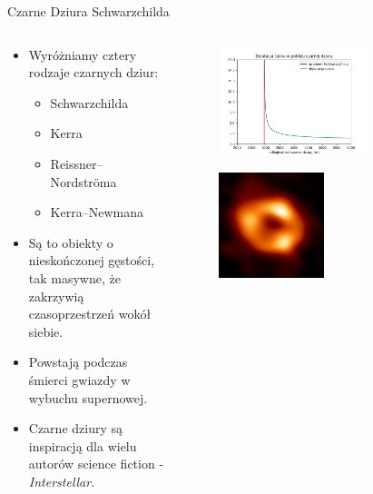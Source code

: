 \documentclass[polish, 9pt, xcolor=table, hyperref={pdfpagemode=FullScreen}]{beamer}
\begin{document}
\begin{frame}{Czarne Dziura Schwarzchilda}
\begin{columns}
\begin{column}{0.5\textwidth}
\begin{itemize}
\item
	Wyróżniamy cztery rodzaje czarnych dziur: 
\begin{itemize}
\item
	Schwarzchilda
\item 
	Kerra 
\item
	Reissner–Nordströma
\item 
	Kerra–Newmana
\end{itemize}
\item 
	Są to obiekty o nieskończonej gęstości, tak masywne, że zakrzywią czasoprzestrzeń wokół siebie.
\item 
	Powstają podczas śmierci gwiazdy w wybuchu supernowej. 
\item
	Czarne dziury są inspiracją dla wielu autorów science fiction - \textit{Interstellar}.
\end{itemize}
\end{column}
	
\begin{column}{0.5\textwidth}
\begin{figure}
\centering
 \includegraphics[width=0.7\textwidth]{ilustracje/Time_near_black_hole.png}
\end{figure}

\begin{figure}
\centering
\includegraphics[width=0.5\textwidth]{ilustracje/zakazany_donut.jpg}
\end{figure}
\end{column}
\end{columns}
\end{frame}
\end{document}

